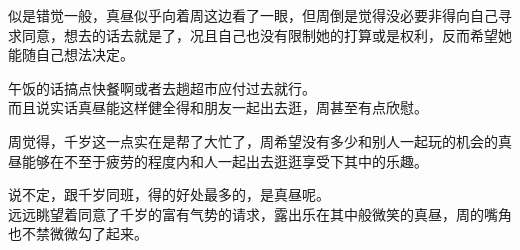 似是错觉一般，真昼似乎向着周这边看了一眼，但周倒是觉得没必要非得向自己寻求同意，想去的话去就是了，况且自己也没有限制她的打算或是权利，反而希望她能随自己想法决定。

午饭的话搞点快餐啊或者去趟超市应付过去就行。\\

而且说实话真昼能这样健全得和朋友一起出去逛，周甚至有点欣慰。

周觉得，千岁这一点实在是帮了大忙了，周希望没有多少和别人一起玩的机会的真昼能够在不至于疲劳的程度内和人一起出去逛逛享受下其中的乐趣。

说不定，跟千岁同班，得的好处最多的，是真昼呢。\\

远远眺望着同意了千岁的富有气势的请求，露出乐在其中般微笑的真昼，周的嘴角也不禁微微勾了起来。
